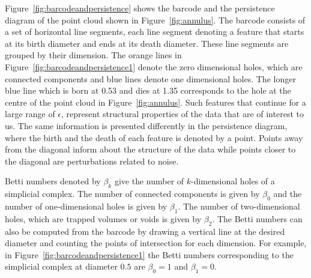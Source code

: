 \documentclass[letter,12pt]{article}
\begin{document}
Figure~\ref{fig:barcodeandpersistence} shows the barcode and the persistence diagram of the point cloud shown in Figure~\ref{fig:annulus}. The barcode consists of a set of horizontal line segments, each line segment denoting a feature that starts at its birth diameter and ends at its death diameter. These line segments are grouped by their dimension. The orange lines in Figure~\ref{fig:barcodeandpersistence1} denote the zero dimensional holes, which are connected components and blue lines denote one dimensional holes. The longer blue line which is born at  0.53 and dies at 1.35 corresponds to the hole at the centre of the point cloud in Figure~\ref{fig:annulus}. Such features that continue for a large range of $\epsilon$, represent  structural properties of the data that are of interest to us. The same information is presented differently in the persistence diagram, where the birth and the death of each feature is denoted by a point. Points away from the diagonal inform about the structure of the data while points closer to the diagonal are perturbations related to noise.  

Betti numbers denoted by $\beta_k$ give the number of $k$-dimensional holes of a  simplicial complex. The number of connected components is given by $\beta_0$ and the number of one-dimensional holes is given by $\beta_1$. The number of two-dimensional holes, which are trapped volumes or voids is given by $\beta_2$. The Betti numbers can also be computed from the barcode by drawing a vertical line at the desired diameter and counting the points of intersection for each dimension. For example, in Figure~\ref{fig:barcodeandpersistence1} the Betti numbers corresponding to the simplicial complex at diameter $0.5$ are $\beta_0 = 1$ and $\beta_1 = 0$.  
\end{document}
